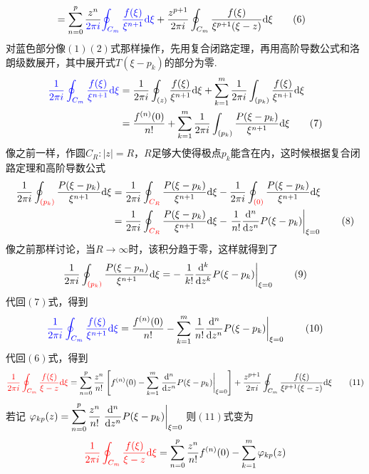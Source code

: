 \documentclass[main.tex]{subfiles}
\begin{document}
{\begin{align}
    &= \sum_{n=0}^{p}\frac{z^n}{\color{blue}2\pi i}{\color{blue}\oint_{C_m}\frac{f(\xi)}{\xi^{n+1}}{\rm d}\xi}
    +\frac{z^{p+1}}{2\pi i}\oint_{C_m}\frac{f(\xi)}{\xi^{p+1}(\xi-z)}{\rm d}\xi \tag{6}
\end{align}
对蓝色部分像\((1)(2)\)式那样操作，先用复合闭路定理，再用高阶导数公式和洛朗级数展开，其中展开式\(T(\xi-p_k)\)的部分为零.
\begin{align}
    {\color{blue}\frac{1}{2\pi i}\oint_{C_m}\frac{f(\xi)}{\xi^{n+1}}{\rm d}\xi} &= 
    \frac{1}{2\pi i}\oint_{(z)}\frac{f(\xi)}{\xi^{n+1}}{\rm d}\xi
    +\sum_{k=1}^m\frac{1}{2\pi i}\int_{(p_k)}\frac{f(\xi)}{\xi^{n+1}}{\rm d}\xi \notag \\ 
    &= \frac{f^{(n)}(0)}{n!} + \sum_{k=1}^m\frac{1}{2\pi i}\int_{(p_k)}\frac{P(\xi-p_k)}{\xi^{n+1}}{\rm d}\xi \tag{7}
\end{align}
像之前一样，作圆\(C_R:|z|=R\)，\(R\)足够大使得极点\(p_k\)能含在内，这时候根据复合闭路定理和高阶导数公式
\begin{align}
    \frac{1}{2\pi i}\oint_{\color{red}(p_k)}\frac{P(\xi-p_k)}{\xi^{n+1}}{\rm d}\xi &= 
    \frac{1}{2\pi i}\oint_{\color{red}C_R}\frac{P(\xi-p_k)}{\xi^{n+1}}{\rm d}\xi
    - \frac{1}{2\pi i}\oint_{\color{red}(0)}\frac{P(\xi-p_k)}{\xi^{n+1}}{\rm d}\xi \notag \\
    &= \frac{1}{2\pi i}\oint_{\color{red}C_R}\frac{P(\xi-p_k)}{\xi^{n+1}}{\rm d}\xi 
    - \left.\frac{1}{n!}\frac{{\rm d}^{n}}{{\rm d}z^n}P(\xi-p_k)\right|_{\xi=0}
    \tag{8}
\end{align}
像之前那样讨论，当\(R \to \infty\)时，该积分趋于零，这样就得到了
\[\frac{1}{2\pi i}\oint_{\color{red}(p_k)}\frac{P(\xi-p_n)}{\xi^{n+1}}{\rm d}\xi = -\left.\frac{1}{k!}\frac{{\rm d}^{k}}{{\rm d}z^k}P(\xi-p_k)\right|_{\xi=0} \tag{9}\]
代回\((7)\)式，得到
\[{\color{blue}\frac{1}{2\pi i}\oint_{C_m}\frac{f(\xi)}{\xi^{n+1}}{\rm d}\xi} = \frac{f^{(n)}(0)}{n!} - \sum_{k=1}^m\left.\frac{1}{n!}\frac{{\rm d}^{n}}{{\rm d}z^n}P(\xi-p_k)\right|_{\xi=0} \tag{10}\]
代回\((6)\)式，得到
\[{\color{red} \frac{1}{2\pi i}\oint_{C_m}\frac{f(\xi)}{\xi-z}{\rm d}\xi} = 
\sum_{n=0}^{p}\frac{z^n}{n!}\left[f^{(n)}(0) - \sum_{k=1}^m\left.\frac{{\rm d}^{n}}{{\rm d}z^n}P(\xi-p_k)\right|_{\xi=0}\right]
+\frac{z^{p+1}}{2\pi i}\oint_{C_m}\frac{f(\xi)}{\xi^{p+1}(\xi-z)}{\rm d}\xi \tag{11}\]
若记
\(\displaystyle{\varphi_{kp}(z)=\sum_{n=0}^{p}\frac{z^n}{n!}\left.\frac{{\rm d}^{n}}{{\rm d}z^n}P(\xi-p_k)\right|_{\xi=0}}\)
则\((11)\)式变为
\[{\color{red} \frac{1}{2\pi i}\oint_{C_m}\frac{f(\xi)}{\xi-z}{\rm d}\xi} = 
\sum_{n=0}^{p}\frac{z^n}{n!}f^{(n)}(0) - \sum_{k=1}^m\varphi_{kp}(z)
\]}
\end{document}
